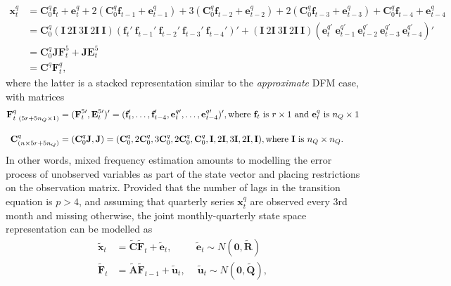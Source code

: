 \documentclass[a4paper]{article}
\begin{document}
\begin{align} 
\textbf{x}^q_t &= \textbf{C}_0^q\textbf{f}_t + \textbf{e}^q_t + 2(\textbf{C}_0^q\textbf{f}_{t-1} + \textbf{e}^q_{t-1}) + 3(\textbf{C}_0^q\textbf{f}_{t-2} + \textbf{e}^q_{t-2}) + 2(\textbf{C}_0^q\textbf{f}_{t-3} + \textbf{e}^q_{t-3}) + \textbf{C}_0^q\textbf{f}_{t-4} + \textbf{e}^q_{t-4} \\
&= \textbf{C}_0^q (\textbf{I}\ 2\textbf{I}\ 3\textbf{I}\ 2\textbf{I}\ \textbf{I})(\textbf{f}_t'\ \textbf{f}_{t-1}'\ \textbf{f}_{t-2}'\ \textbf{f}_{t-3}'\ \textbf{f}_{t-4}')' + (\textbf{I}\ 2\textbf{I}\ 3\textbf{I}\ 2\textbf{I}\ \textbf{I})(\textbf{e}^{q\prime}_t\ \textbf{e}^{q\prime}_{t-1}\ \textbf{e}^{q\prime}_{t-2}\ \textbf{e}^{q\prime}_{t-3}\ \textbf{e}^{q\prime}_{t-4})' \\
&= \textbf{C}_0^q\textbf{J}\textbf{F}^5_t + \textbf{J}\textbf{E}^5_t \\
&= \textbf{C}^q\textbf{F}^q_t,
\end{align}
where the latter is a stacked representation similar to the \emph{approximate} DFM case, with matrices
\begin{align} \label{eq:Ftmf}
\textbf{F}^q_{t\ (5r+5n_Q \times 1)}  &= (\textbf{F}^{5\prime}_t, \textbf{E}_t^{5\prime})' = (\textbf{f}_t', \dots, \textbf{f}_{t-4}', \textbf{e}^{q\prime}_t, \dots, \textbf{e}^{q\prime}_{t-4})', \text{where $\textbf{f}_t$ is $r\times 1$ and $\textbf{e}^q_t$ is $n_Q\times 1$} \\[1em]
\textbf{C}^q_{(n \times 5r+5n_Q)}  &= (\textbf{C}_0^q\textbf{J}, \textbf{J}) = (\textbf{C}_0^q, 2\textbf{C}_0^q, 3\textbf{C}_0^q, 2\textbf{C}_0^q, \textbf{C}_0^q, \textbf{I}, 2\textbf{I}, 3\textbf{I}, 2\textbf{I}, \textbf{I}), \text{where \textbf{I} is $n_Q\times n_Q$.}
\end{align}
In other words, mixed frequency estimation amounts to modelling the error process of unobserved variables as part of the state vector and placing restrictions on the observation matrix. Provided that the number of lags in the transition equation is $p > 4$, and assuming that quarterly series $\textbf{x}_t^q$ are observed every 3rd month and missing otherwise, the joint monthly-quarterly state space representation can be modelled as 
\begin{align} \label{eq:domf}
\tilde{\textbf{x}}_t &= \tilde{\textbf{C}} \tilde{\textbf{F}}_t + \tilde{\textbf{e}}_t, \ \qquad\ \tilde{\textbf{e}}_t\sim  N(\textbf{0}, \tilde{\textbf{R}}) \\
\tilde{\textbf{F}}_t &= \tilde{\textbf{A}}\tilde{\textbf{F}}_{t-1} + \tilde{\textbf{u}}_t, \quad\ \tilde{\textbf{u}}_t\sim  N(\textbf{0}, \tilde{\textbf{Q}}),
\end{align}
\end{document}
